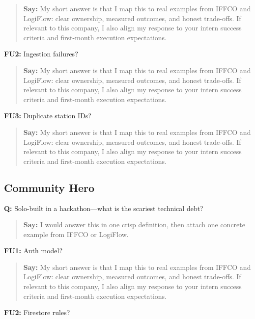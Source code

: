 \documentclass[9pt,a4paper]{article}
\begin{document}
\begin{quote}\small\textbf{Say:} My short answer is that I map this to real examples from IFFCO and LogiFlow: clear ownership, measured outcomes, and honest trade-offs. If relevant to this company, I also align my response to your intern success criteria and first-month execution expectations.\end{quote}
\vspace{2mm}
\textbf{FU2:} Ingestion failures?

\begin{quote}\small\textbf{Say:} My short answer is that I map this to real examples from IFFCO and LogiFlow: clear ownership, measured outcomes, and honest trade-offs. If relevant to this company, I also align my response to your intern success criteria and first-month execution expectations.\end{quote}
\vspace{2mm}
\textbf{FU3:} Duplicate station IDs?

\begin{quote}\small\textbf{Say:} My short answer is that I map this to real examples from IFFCO and LogiFlow: clear ownership, measured outcomes, and honest trade-offs. If relevant to this company, I also align my response to your intern success criteria and first-month execution expectations.\end{quote}
\vspace{2mm}
\subsection{Community Hero}
\textbf{Q:} Solo-built in a hackathon---what is the scariest technical debt?

\begin{quote}\small\textbf{Say:} I would answer this in one crisp definition, then attach one concrete example from IFFCO or LogiFlow.\end{quote}
\vspace{2mm}
\textbf{FU1:} Auth model?

\begin{quote}\small\textbf{Say:} My short answer is that I map this to real examples from IFFCO and LogiFlow: clear ownership, measured outcomes, and honest trade-offs. If relevant to this company, I also align my response to your intern success criteria and first-month execution expectations.\end{quote}
\vspace{2mm}
\textbf{FU2:} Firestore rules?
\end{document}
